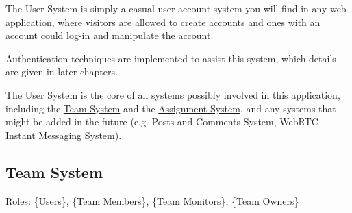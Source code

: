 \documentclass[12pt]{report}
\begin{document}
The User System is simply a casual user account system you will find in any web application,
where visitors are allowed to create accounts and ones with an account could log-in and manipulate the account.
\vspace{1 em}

Authentication techniques are implemented to assist this system, which details are given in later chapters.
\vspace{1 em}

The User System is the core of all systems possibly involved in this application,
including the \hyperref[overview.project-objectives.team-system]{Team System}
and the \hyperref[overview.project-objectives.assignment-system]{Assignment System},
and any systems that might be added in the future (e.g. Posts and Comments System, WebRTC Instant Messaging System).

\newpage
\subsection{Team System} \label{overview.project-objectives.team-system}

Roles: \{Users\}, \{Team Members\}, \{Team Monitors\}, \{Team Owners\}
\end{document}
